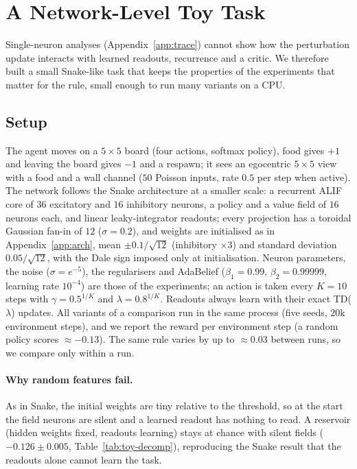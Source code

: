 \documentclass[10pt,twocolumn]{article}
\begin{document}
\section{A Network-Level Toy Task}
\label{app:gridtoy}

Single-neuron analyses (Appendix~\ref{app:trace}) cannot show how the
perturbation update interacts with learned readouts, recurrence and a critic. We
therefore built a small Snake-like task that keeps the properties of the
experiments that matter for the rule, small enough to run many variants on a CPU.

\subsection{Setup}
\label{app:gridtoy-setup}
The agent moves on a $5\times5$ board (four actions, softmax policy), food gives
$+1$ and leaving the board gives $-1$ and a respawn; it sees an egocentric
$5\times5$ view with a food and a wall channel ($50$ Poisson inputs, rate $0.5$
per step when active). The network follows the Snake architecture at a smaller
scale: a recurrent ALIF core of $36$ excitatory and $16$ inhibitory neurons, a
policy and a value field of $16$ neurons each, and linear leaky-integrator
readouts; every projection has a toroidal Gaussian fan-in of $12$
($\sigma=0.2$), and weights are initialised as in Appendix~\ref{app:arch}, mean
$\pm0.1/\sqrt{12}$ (inhibitory $\times3$) and standard deviation
$0.05/\sqrt{12}$, with the Dale sign imposed only at initialisation. Neuron
parameters, the noise ($\sigma=e^{-5}$), the regularisers and AdaBelief
($\beta_1=0.99$, $\beta_2=0.99999$, learning rate $10^{-4}$) are those of the
experiments; an action is taken every $K=10$ steps with $\gamma=0.5^{1/K}$ and
$\lambda=0.8^{1/K}$. Readouts always learn with their exact TD($\lambda$)
updates. All variants of a comparison run in the same process (five seeds,
$20$k environment steps), and we report the reward per environment step (a random
policy scores $\approx-0.13$). The same rule varies by up to
$\approx0.03$ between runs, so we compare only within a run.

\paragraph{Why random features fail.}
As in Snake, the initial weights are tiny relative to the threshold, so at the
start the field neurons are silent and a learned readout has nothing to read. A
reservoir (hidden weights fixed, readouts learning) stays at chance with silent
fields ($-0.126\pm0.005$, Table~\ref{tab:toy-decomp}), reproducing the Snake result that
the readouts alone cannot learn the task.
\end{document}
